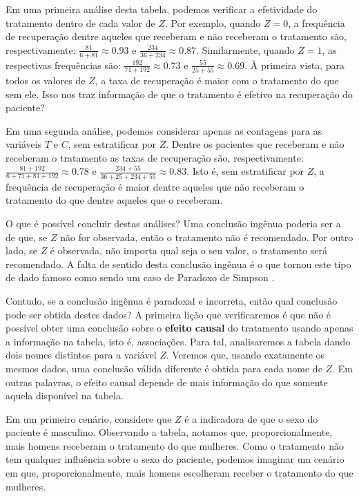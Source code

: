 Em uma primeira análise desta tabela, podemos 
verificar a efetividade do tratamento 
dentro de cada valor de $Z$.
Por exemplo, quando $Z=0$,
a frequência de recuperação dentre aqueles que 
receberam e não receberam o tratamento 
são, respectivamente: $\frac{81}{6+81} \approx 0.93$ e
$\frac{234}{36+234} \approx 0.87$.
Similarmente, quando $Z=1$,
as respectivas frequências são:
$\frac{192}{71+192} \approx 0.73$ e
$\frac{55}{25+55} \approx 0.69$.
À primeira vista, para todos os valores de $Z$, a taxa de recuperação 
é maior com o tratamento do que sem ele.
Isso nos traz informação de que 
o tratamento é efetivo na recuperação do paciente?

Em uma segunda análise, podemos considerar
apenas as contagens para as variáveis $T$ e $C$,
sem estratificar por $Z$.
Dentre os pacientes que receberam e não receberam o tratamento
as taxas de recuperação são, respectivamente:
$\frac{81+192}{6+71+81+192} \approx 0.78$ e
$\frac{234+55}{36+25+234+55} \approx 0.83$. Isto é,
sem estratificar por $Z$, a frequência de recuperação é
maior dentre aqueles que não receberam o tratamento
do que dentre aqueles que o receberam.

O que é possível concluir destas análises?
Uma conclusão ingênua poderia ser a de que,
se $Z$ não for observada, então o tratamento não é recomendado.
Por outro lado, se $Z$ é observada, 
não importa qual seja o seu valor, o tratamento será recomendado.
A falta de sentido desta conclusão ingênua é
o que tornou este tipo de dado famoso como sendo
um caso de Paradoxo de Simpson \citep{Simpson1951}.

Contudo, se a conclusão ingênua é paradoxal e incorreta,
então qual conclusão pode ser obtida destes dados?
A primeira lição que verificaremos é que não é possível obter
uma conclusão sobre o \textbf{efeito causal} do tratamento usando
apenas a informação na tabela, isto é, associações.
Para tal, analisaremos a tabela dando 
dois nomes distintos para a variável $Z$.
Veremos que, usando exatamente os mesmos dados,
uma conclusão válida diferente é obtida para cada nome de $Z$.
Em outras palavras, o efeito causal depende de
mais informação do que somente aquela disponível na tabela.

Em um primeiro cenário, considere que $Z$ é a indicadora de que
o sexo do paciente é masculino.
Observando a tabela, notamos que, proporcionalmente, 
mais homens receberam o tratamento do que mulheres.
Como o tratamento não tem qualquer influência sobre o sexo do paciente,
podemos imaginar um cenário em que, proporcionalmente,
mais homens escolheram receber o tratamento do que mulheres.

